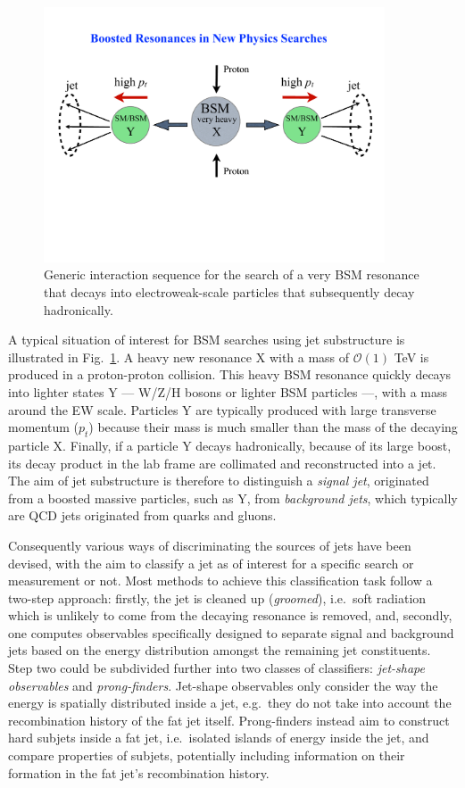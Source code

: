 \begin{figure}
\begin{center}
\includegraphics[width=0.9\textwidth]{figures/resonances}
\caption{Generic interaction sequence for the search of a very BSM
  resonance that decays into electroweak-scale particles that
  subsequently decay hadronically.}
\label{fig:resonance} 
\end{center}
\end{figure}
A typical situation of interest for BSM searches using jet
substructure is illustrated in Fig.~\ref{fig:resonance}. A heavy new
resonance X with a mass of $\mathcal{O}{(1)}$ TeV is produced in a
proton-proton collision. This heavy BSM resonance quickly decays into
lighter states Y --- \eg W/Z/H bosons or lighter BSM particles ---,
with a mass around the EW scale. Particles Y are
typically produced with large transverse momentum ($p_t$) because
their mass is much smaller than the mass of the decaying particle
X. Finally, if a particle Y decays hadronically, because of its
large boost, its decay product in the lab frame are collimated and
reconstructed into a jet. The aim of jet substructure is therefore to
distinguish a \emph{signal jet}, originated from a boosted massive
particles, such as Y, from \emph{background jets}, which typically are
QCD jets originated from quarks and gluons.


Consequently various ways of discriminating the sources of jets have
been devised, with the aim to classify a jet as of interest for a
specific search or measurement or not. Most methods to achieve this
classification task follow a two-step approach: firstly, the jet is
cleaned up ({\it groomed}), i.e.\ soft radiation which is unlikely to
come from the decaying resonance is removed, and, secondly, one
computes observables specifically designed to separate signal and
background jets based on the energy distribution amongst the remaining
jet constituents. Step two could be subdivided further into two
classes of classifiers: {\it jet-shape observables} and {\it
  prong-finders}. Jet-shape observables only consider the way the
energy is spatially distributed inside a jet, e.g.\ they do not take
into account the recombination history of the fat jet
itself. Prong-finders instead aim to construct hard subjets inside a
fat jet, i.e.\ isolated islands of energy inside the jet, and compare
properties of subjets, potentially including information on their
formation in the fat jet's recombination history.

